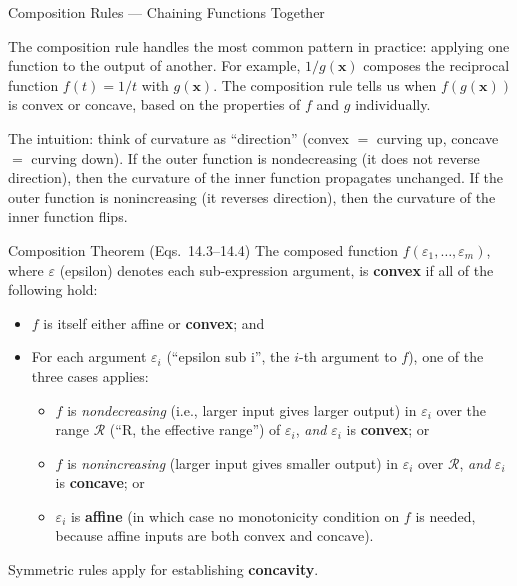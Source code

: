 \documentclass[aspectratio=169,10pt]{beamer}
\begin{document}
\begin{frame}[allowframebreaks]{Composition Rules --- Chaining Functions Together}

  The composition rule handles the most common pattern in practice:
  applying one function to the output of another.  For example,
  $1/g(\mathbf{x})$ composes the reciprocal function $f(t) = 1/t$ with
  $g(\mathbf{x})$.  The composition rule tells us when
  $f(g(\mathbf{x}))$ is convex or concave, based on the properties
  of $f$ and $g$ individually.

  The intuition: think of curvature as ``direction'' (convex $=$ curving
  up, concave $=$ curving down).  If the outer function is nondecreasing
  (it does not reverse direction), then the curvature of the inner
  function propagates unchanged.  If the outer function is nonincreasing
  (it reverses direction), then the curvature of the inner function
  flips.

  \begin{block}{Composition Theorem (Eqs.\ 14.3--14.4)}
    The composed function $f(\varepsilon_1, \ldots, \varepsilon_m)$,
    where $\varepsilon$ (epsilon) denotes each sub-expression argument,
    is \textbf{convex} if all of the following hold:
    \begin{itemize}
      \item $f$ is itself either affine or \textbf{convex}; and
      \item For each argument $\varepsilon_i$ (``epsilon sub i'',
            the $i$-th argument to $f$), one of the three cases applies:
        \begin{itemize}
          \item[$\triangleright$] $f$ is \emph{nondecreasing}
                (i.e., larger input gives larger output) in
                $\varepsilon_i$ over the range $\mathcal{R}$
                (``R, the effective range'') of $\varepsilon_i$,
                \emph{and} $\varepsilon_i$ is \textbf{convex}; or
          \item[$\triangleright$] $f$ is \emph{nonincreasing}
                (larger input gives smaller output) in $\varepsilon_i$
                over $\mathcal{R}$, \emph{and} $\varepsilon_i$ is
                \textbf{concave}; or
          \item[$\triangleright$] $\varepsilon_i$ is \textbf{affine}
                (in which case no monotonicity condition on $f$ is
                needed, because affine inputs are both convex and
                concave).
        \end{itemize}
    \end{itemize}
    Symmetric rules apply for establishing \textbf{concavity}.
  \end{block}


\end{frame}
\end{document}
